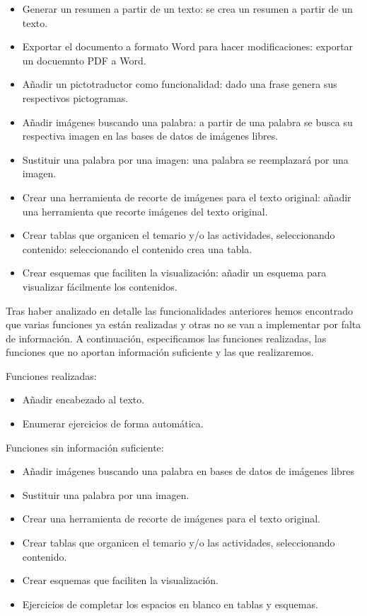 \begin{itemize}
  \item Generar un resumen a partir de un texto: se crea un resumen a partir de un texto.
  \item Exportar el documento a formato Word para hacer modificaciones: exportar un docuemnto PDF a Word.
  \item Añadir un pictotraductor como funcionalidad: dado una frase genera sus respectivos pictogramas.
  \item Añadir imágenes buscando una palabra: a partir de una palabra se busca su respectiva imagen en las bases de datos de imágenes libres.
  \item Sustituir una palabra por una imagen: una palabra se reemplazará por una imagen.
  \item Crear una herramienta de recorte de imágenes para el texto original: añadir una herramienta que recorte imágenes del texto original.
  \item Crear tablas que organicen el temario y/o las actividades, seleccionando contenido: seleccionando el contenido crea una tabla.
  \item Crear esquemas que faciliten la visualización: añadir un esquema para visualizar fácilmente los contenidos.
\end{itemize}
Tras haber analizado en detalle las funcionalidades anteriores hemos encontrado que varias funciones ya están realizadas y otras no se van a implementar por falta de información. A continuación, especificamos las funciones realizadas, las funciones que no aportan información suficiente y las que realizaremos.

Funciones realizadas:
  \begin{itemize}
    \item Añadir encabezado al texto.
    \item Enumerar ejercicios de forma automática.
  \end{itemize}
Funciones sin información suficiente:
\begin{itemize}
  \item Añadir imágenes buscando una palabra en bases de datos de imágenes libres
  \item Sustituir una palabra por una imagen.
  \item Crear una herramienta de recorte de imágenes para el texto original.
  \item Crear tablas que organicen el temario y/o las actividades, seleccionando contenido.
  \item Crear esquemas que faciliten la visualización.
  \item Ejercicios de completar los espacios en blanco en tablas y esquemas.
\end{itemize}


